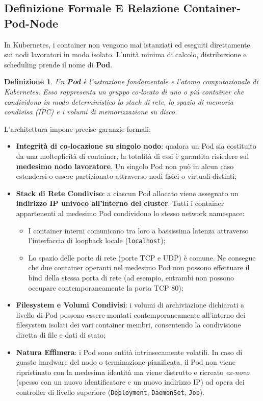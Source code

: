 \documentclass[11pt, a4paper]{article}
\newtheorem{theorem}{Definizione}
\begin{document}
\subsection{Definizione Formale E Relazione Container-Pod-Node}
In Kubernetes, i container non vengono mai istanziati ed eseguiti direttamente sui nodi lavoratori in modo isolato. L'unità minima di calcolo, distribuzione e scheduling prende il nome di \textbf{Pod}.


\begin{theorem}
Un \textbf{Pod} è l'astrazione fondamentale e l'atomo computazionale di Kubernetes. Esso rappresenta un gruppo co-locato di uno o più container che condividono in modo deterministico lo stack di rete, lo spazio di memoria condivisa (IPC) e i volumi di memorizzazione su disco.
\end{theorem}

L'architettura impone precise garanzie formali:
\begin{itemize}[noitemsep]
    \item \textbf{Integrità di co-locazione su singolo nodo}: qualora un Pod sia costituito da una molteplicità di container, la totalità di essi è garantita risiedere sul \textbf{medesimo nodo lavoratore}. Un singolo Pod non può in alcun caso estendersi o essere partizionato attraverso nodi fisici o virtuali distinti;
    \item \textbf{Stack di Rete Condiviso}: a ciascun Pod allocato viene assegnato un \textbf{indirizzo IP univoco all'interno del cluster}. Tutti i container appartenenti al medesimo Pod condividono lo stesso network namespace:
    \begin{itemize}[noitemsep]
        \item I container interni comunicano tra loro a bassissima latenza attraverso l'interfaccia di loopback locale (\texttt{localhost});
        \item Lo spazio delle porte di rete (porte TCP e UDP) è comune. Ne consegue che due container operanti nel medesimo Pod non possono effettuare il bind della stessa porta di rete (ad esempio, entrambi non possono occupare contemporaneamente la porta TCP 80);
    \end{itemize}
    \item \textbf{Filesystem e Volumi Condivisi}: i volumi di archiviazione dichiarati a livello di Pod possono essere montati contemporaneamente all'interno dei filesystem isolati dei vari container membri, consentendo la condivisione diretta di file e dati di stato;
    \item \textbf{Natura Effimera}: i Pod sono entità intrinsecamente volatili. In caso di guasto hardware del nodo o terminazione pianificata, il Pod non viene ripristinato con la medesima identità ma viene distrutto e ricreato \emph{ex-novo} (spesso con un nuovo identificatore e un nuovo indirizzo IP) ad opera dei controller di livello superiore (\texttt{Deployment}, \texttt{DaemonSet}, \texttt{Job}).
\end{itemize}
\end{document}
